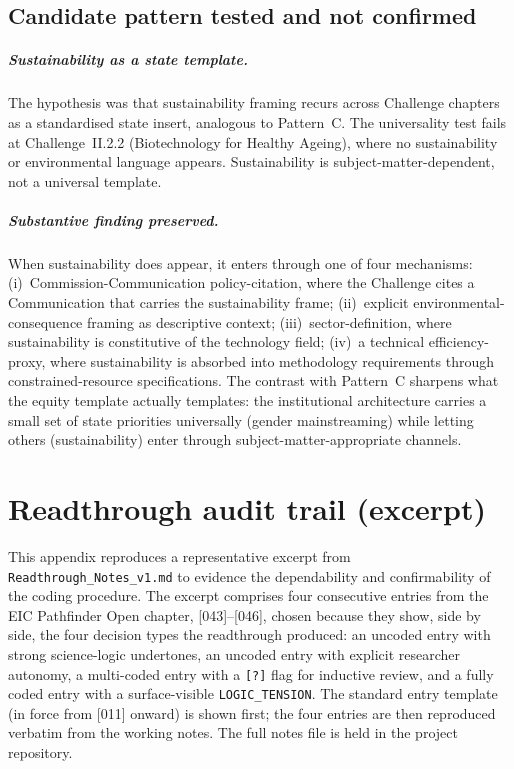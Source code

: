 \section{Candidate pattern tested and not confirmed}
\label{sec:app-c-not-confirmed}

\paragraph{Sustainability as a state template.}
The hypothesis was that sustainability framing recurs across Challenge
chapters as a standardised state insert, analogous to Pattern~C. The
universality test fails at Challenge~II.2.2 (Biotechnology for Healthy
Ageing), where no sustainability or environmental language appears.
Sustainability is subject-matter-dependent, not a universal template.

\paragraph{Substantive finding preserved.}
When sustainability does appear, it enters through one of four
mechanisms: (i)~Commission-Communication policy-citation, where the
Challenge cites a Communication that carries the sustainability frame;
(ii)~explicit environmental-consequence framing as descriptive context;
(iii)~sector-definition, where sustainability is constitutive of the
technology field; (iv)~a technical efficiency-proxy, where
sustainability is absorbed into methodology requirements through
constrained-resource specifications. The contrast with Pattern~C
sharpens what the equity template actually templates: the institutional
architecture carries a small set of state priorities universally
(gender mainstreaming) while letting others (sustainability) enter
through subject-matter-appropriate channels.

\chapter{Readthrough audit trail (excerpt)}
\label{app:audit-trail}

This appendix reproduces a representative excerpt from
\texttt{Readthrough\_Notes\_v1.md} to evidence the dependability and
confirmability of the coding procedure. The excerpt comprises four
consecutive entries from the EIC Pathfinder Open chapter,
[043]--[046], chosen because they show, side by side, the four
decision types the readthrough produced: an uncoded entry with strong
science-logic undertones, an uncoded entry with explicit researcher
autonomy, a multi-coded entry with a \texttt{[?]} flag for inductive
review, and a fully coded entry with a surface-visible
\texttt{LOGIC\_TENSION}. The standard entry template (in force from
[011] onward) is shown first; the four entries are then reproduced
verbatim from the working notes. The full notes file is held in the
project repository.

